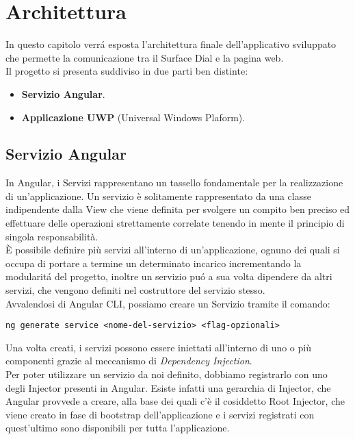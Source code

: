 \chapter{Architettura}
\label{chap:arch}

In questo capitolo verrá esposta l'architettura finale dell'applicativo sviluppato che permette la comunicazione tra il Surface Dial e la pagina web.\\

Il progetto si presenta suddiviso in due parti ben distinte:
\begin{itemize}
\item \textbf{Servizio Angular}.
\item \textbf{Applicazione UWP} (Universal Windows Plaform).
\end{itemize}

\section{Servizio Angular}
In Angular, i Servizi rappresentano un tassello fondamentale per la realizzazione di un'applicazione. Un servizio è solitamente rappresentato da una classe indipendente dalla View che viene definita per svolgere un compito ben preciso ed effettuare delle operazioni strettamente correlate tenendo in mente il principio di singola responsabilità.\\
È possibile definire più servizi all'interno di un'applicazione, ognuno dei quali si occupa di portare a termine un determinato incarico incrementando la modularitá del progetto, inoltre un servizio puó a sua volta dipendere da altri servizi, che vengono definiti nel costruttore del servizio stesso.\\

Avvalendosi di Angular CLI, possiamo creare un Servizio tramite il comando:

\vspace{1.0cm}
\begin{lstlisting}[caption={Esempio creazione servizio},style=javaScriptCode]
	ng generate service <nome-del-servizio> <flag-opzionali>
\end{lstlisting} 
\vspace{1.0cm}
Una volta creati, i servizi possono essere iniettati all'interno di uno o più componenti grazie al meccanismo di \emph{Dependency Injection}.\\

Per poter utilizzare un servizio da noi definito, dobbiamo registrarlo con uno degli Injector presenti in Angular. Esiste infatti una gerarchia di Injector, che Angular provvede a creare, alla base dei quali c'è il cosiddetto Root Injector, che viene creato in fase di bootstrap dell’applicazione e i servizi registrati con quest’ultimo sono disponibili per tutta l’applicazione.\\


